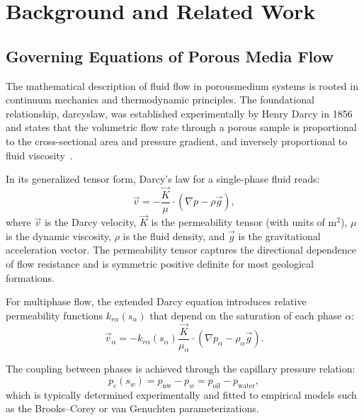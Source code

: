 \chapter{Background and Related Work}
\label{ch:background}

\section{Governing Equations of Porous Media Flow}
\label{sec:background:governing}

The mathematical description of fluid flow in \gls{porousmedium} systems is rooted in continuum mechanics and thermodynamic principles. The foundational relationship, \gls{darcyslaw}, was established experimentally by Henry Darcy in 1856 and states that the volumetric flow rate through a porous sample is proportional to the cross-sectional area and pressure gradient, and inversely proportional to fluid viscosity~\cite{baehrThermodynamikGrundlagenUnd2016}.

In its generalized tensor form, Darcy's law for a single-phase fluid reads:
\begin{equation}
    \vec{v} = -\frac{\vec{K}}{\mu} \cdot \left( \nabla p - \rho \vec{g} \right),
    \label{eq:darcy}
\end{equation}
where $\vec{v}$ is the Darcy velocity, $\vec{K}$ is the permeability tensor (with units of m$^2$), $\mu$ is the dynamic viscosity, $\rho$ is the fluid density, and $\vec{g}$ is the gravitational acceleration vector. The permeability tensor captures the directional dependence of flow resistance and is symmetric positive definite for most geological formations.

For multiphase flow, the extended Darcy equation introduces relative permeability functions $k_{r\alpha}(s_\alpha)$ that depend on the saturation of each phase $\alpha$:
\begin{equation}
    \vec{v}_\alpha = -k_{r\alpha}(s_\alpha) \frac{\vec{K}}{\mu_\alpha} \cdot \left( \nabla p_\alpha - \rho_\alpha \vec{g} \right).
    \label{eq:multiphase_darcy}
\end{equation}

The coupling between phases is achieved through the capillary pressure relation:
\begin{equation}
    p_c(s_w) = p_{\text{nw}} - p_w = p_{\text{oil}} - p_{\text{water}},
    \label{eq:capillary}
\end{equation}
which is typically determined experimentally and fitted to empirical models such as the Brooks--Corey or van Genuchten parameterizations.

